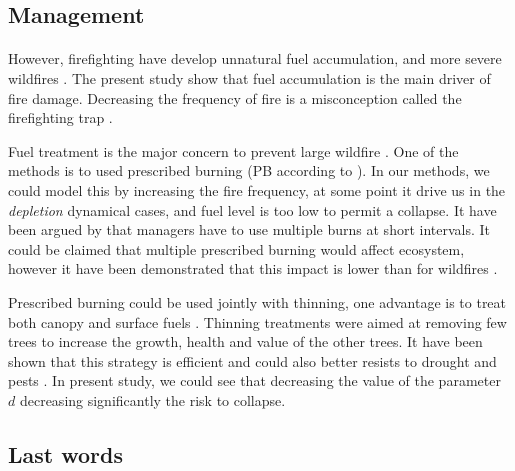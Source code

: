 \documentclass{article}
\begin{document}
\subsection{Management}

\paragraph{}
However, firefighting have develop unnatural fuel accumulation, and more severe wildfires \citep{schoennagel_interaction_2004}. The present study show that fuel accumulation is the main driver of fire damage. Decreasing the frequency of fire is a misconception called the firefighting trap \citep{collins_forest_2013}.

Fuel treatment is the major concern to prevent large wildfire \citep{liu_studying_2013, martinson_performance_nodate}. One of the methods is to used prescribed burning (PB according to \cite{liu_analyzing_2010}). In our methods, we could model this by increasing the fire frequency, at some point it drive us in the \textit{depletion} dynamical cases, and fuel level is too low to permit a collapse. It have been argued by \cite{scholl_fire_2010} that managers have to use multiple burns at short intervals. It could be claimed that multiple prescribed burning would affect ecosystem, however it have been demonstrated that this impact is lower than for wildfires \citep{alcaniz2018effects, fultz2016forest, wiedinmyer2010prescribed}. 

Prescribed burning could be used jointly with thinning, one advantage is to treat both canopy and surface fuels \citep{kalies_tamm_2016, agee_basic_2005}. Thinning treatments were aimed at removing few trees to increase the growth, health and value of the other trees. It have been shown that this strategy is efficient \citep{hurteau2008carbon} and could also better resists to drought \citep{d2013effects} and pests \citep{waring2005silvicultural}. In present study, we could see that decreasing the value of the parameter $d$ decreasing significantly the risk to collapse.




\subsection{Last words}

\todo{}
\end{document}
